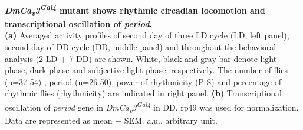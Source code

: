 \label{fig:4}
\textbf{ \emph{DmCa\textsubscript{v}3\textsuperscript{Gal4}} mutant shows rhythmic circadian locomotion and transcriptional oscillation of \emph{period}.}
\\
\textbf{(a)} Averaged activity profiles of second day of three LD cycle (LD, left panel), second day of DD cycle (DD, middle panel) and throughout the behavioral analysis (2 LD + 7 DD) are shown.
White, black and gray bar denote light phase, dark phase and subjective light phase, respectively.
The number of flies (n=37-54) , period (n=26-50), power of rhythmicity (P-S) and percentage of rhythmic flies (rhythmicity) are indicated in right panel.  
\textbf{(b)} Transcriptional oscillation of \emph{period} gene in  \emph{DmCa\textsubscript{v}3\textsuperscript{Gal4}} in DD. rp49 was used for normalization.
Data are represented as mean $\pm$ SEM.
a.u., arbitrary unit.
  
  
  
  